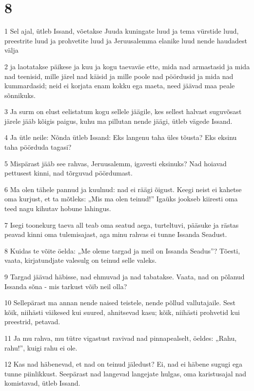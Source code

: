 \chapter{8}

\par 1 Sel ajal, ütleb Issand, võetakse Juuda kuningate luud ja tema vürstide luud, preestrite luud ja prohvetite luud ja Jeruusalemma elanike luud nende haudadest välja
\par 2 ja laotatakse päikese ja kuu ja kogu taevaväe ette, mida nad armastasid ja mida nad teenisid, mille järel nad käisid ja mille poole nad pöördusid ja mida nad kummardasid; neid ei korjata enam kokku ega maeta, need jäävad maa peale sõnnikuks.
\par 3 Ja surm on elust eelistatum kogu sellele jäägile, kes sellest halvast suguvõsast järele jääb kõigis paigus, kuhu ma pillutan nende jäägi, ütleb vägede Issand.
\par 4 Ja ütle neile: Nõnda ütleb Issand: Eks langenu taha üles tõusta? Eks eksinu taha pöörduda tagasi?
\par 5 Mispärast jääb see rahvas, Jeruusalemm, igavesti eksinuks? Nad hoiavad pettusest kinni, nad tõrguvad pöördumast.
\par 6 Ma olen tähele pannud ja kuulnud: nad ei räägi õigust. Keegi neist ei kahetse oma kurjust, et ta mõtleks: „Mis ma olen teinud!” Igaüks jookseb kiiresti oma teed nagu kihutav hobune lahingus.
\par 7 Isegi toonekurg taeva all teab oma seatud aega, turteltuvi, pääsuke ja rästas peavad kinni oma tulemisajast, aga minu rahvas ei tunne Issanda Seadust.
\par 8 Kuidas te võite öelda: „Me oleme targad ja meil on Issanda Seadus”? Tõesti, vaata, kirjatundjate valesulg on teinud selle valeks.
\par 9 Targad jäävad häbisse, nad ehmuvad ja nad tabatakse. Vaata, nad on põlanud Issanda sõna - mis tarkust võib neil olla?
\par 10 Sellepärast ma annan nende naised teistele, nende põllud vallutajaile. Sest kõik, niihästi väikesed kui suured, ahnitsevad kasu; kõik, niihästi prohvetid kui preestrid, petavad.
\par 11 Ja mu rahva, mu tütre vigastust ravivad nad pinnapealselt, öeldes: „Rahu, rahu!”, kuigi rahu ei ole.
\par 12 Kas nad häbenevad, et nad on teinud jäledust? Ei, nad ei häbene sugugi ega tunne piinlikkust. Seepärast nad langevad langejate hulgas, oma karistusajal nad komistavad, ütleb Issand.
